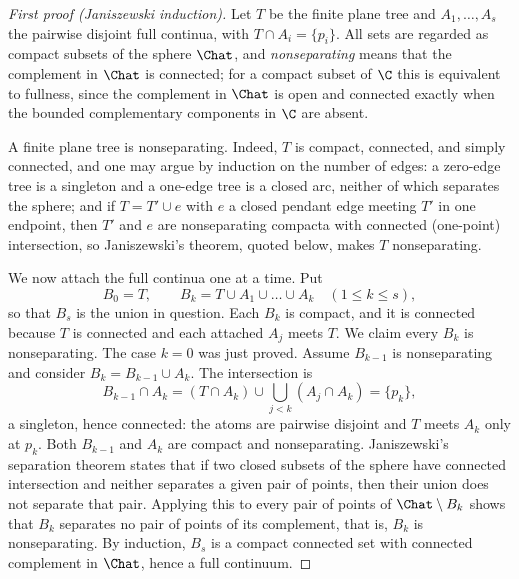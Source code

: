 \begin{proof}[First proof (Janiszewski induction)]
Let $T$ be the finite plane tree and $A_1,\dots,A_s$ the pairwise disjoint
full continua, with $T\cap A_i=\{p_i\}$.  All sets are regarded as compact
subsets of the sphere $\Chat$, and \emph{nonseparating} means that the
complement in $\Chat$ is connected; for a compact subset of $\C$ this is
equivalent to fullness, since the complement in $\Chat$ is open and
connected exactly when the bounded complementary components in $\C$ are
absent.

A finite plane tree is nonseparating.  Indeed, $T$ is compact, connected,
and simply connected, and one may argue by induction on the number of
edges: a zero-edge tree is a singleton and a one-edge tree is a closed
arc, neither of which separates the sphere; and if
$T=T'\cup e$ with $e$ a closed pendant edge meeting $T'$ in one endpoint,
then $T'$ and $e$ are nonseparating compacta with connected (one-point)
intersection, so Janiszewski's theorem, quoted below, makes $T$
nonseparating.

We now attach the full continua one at a time.  Put
\[
B_0=T,\qquad B_k=T\cup A_1\cup\dots\cup A_k\quad(1\le k\le s),
\]
so that $B_s$ is the union in question.  Each $B_k$ is compact, and it is
connected because $T$ is connected and each attached $A_j$ meets $T$.  We
claim every $B_k$ is nonseparating.  The case $k=0$ was just proved.
Assume $B_{k-1}$ is nonseparating and consider $B_k=B_{k-1}\cup A_k$.
The intersection is
\[
B_{k-1}\cap A_k
=(T\cap A_k)\cup\bigcup_{j<k}(A_j\cap A_k)
=\{p_k\},
\]
a singleton, hence connected: the atoms are pairwise disjoint and $T$
meets $A_k$ only at $p_k$.  Both $B_{k-1}$ and $A_k$ are compact and
nonseparating.  Janiszewski's separation theorem
\cite{New51,Why42} states that if two closed subsets of the sphere have
connected intersection and neither separates a given pair of points, then
their union does not separate that pair.  Applying this to every pair of
points of $\Chat\setminus B_k$ shows that $B_k$ separates no pair of
points of its complement, that is, $B_k$ is nonseparating.  By induction,
$B_s$ is a compact connected set with connected complement in $\Chat$,
hence a full continuum.
\end{proof}

